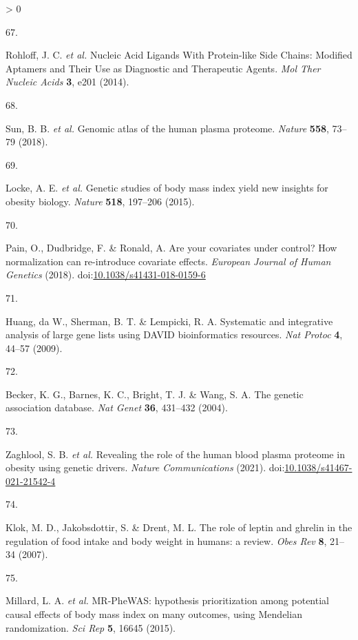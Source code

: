 \documentclass[11pt,twoside]{bristolthesis}
\newlength{\cslhangindent}
\newlength{\csllabelwidth}
\newenvironment{CSLReferences}[2] %
 {%
  \setlength{\parindent}{0pt}
  \ifodd #1 \everypar{\setlength{\hangindent}{\cslhangindent}}\ignorespaces\fi
  \ifnum #2 > 0
  \setlength{\parskip}{#2\baselineskip}
  \fi
 }%
 {}
\newcommand{\CSLLeftMargin}[1]{\parbox[t]{\csllabelwidth}{#1}}
\newcommand{\CSLRightInline}[1]{\parbox[t]{\linewidth - \csllabelwidth}{#1}\break}
\begin{document}
\begin{CSLReferences}{0}{0}
\leavevmode\hypertarget{ref-Rohloff2014}{}%
\CSLLeftMargin{67. }
\CSLRightInline{Rohloff, J. C. \emph{et al.} {Nucleic Acid Ligands With Protein-like Side Chains: Modified Aptamers and Their Use as Diagnostic and Therapeutic Agents}. \emph{Mol Ther Nucleic Acids} \textbf{3}, e201 (2014).}

\leavevmode\hypertarget{ref-Sun2018}{}%
\CSLLeftMargin{68. }
\CSLRightInline{Sun, B. B. \emph{et al.} {Genomic atlas of the human plasma proteome}. \emph{Nature} \textbf{558}, 73--79 (2018).}

\leavevmode\hypertarget{ref-Locke2015}{}%
\CSLLeftMargin{69. }
\CSLRightInline{Locke, A. E. \emph{et al.} {Genetic studies of body mass index yield new insights for obesity biology}. \emph{Nature} \textbf{518}, 197--206 (2015).}

\leavevmode\hypertarget{ref-Pain2018}{}%
\CSLLeftMargin{70. }
\CSLRightInline{Pain, O., Dudbridge, F. \& Ronald, A. {Are your covariates under control? How normalization can re-introduce covariate effects}. \emph{European Journal of Human Genetics} (2018). doi:\href{https://doi.org/10.1038/s41431-018-0159-6}{10.1038/s41431-018-0159-6}}

\leavevmode\hypertarget{ref-Huang2009}{}%
\CSLLeftMargin{71. }
\CSLRightInline{Huang, da W., Sherman, B. T. \& Lempicki, R. A. {Systematic and integrative analysis of large gene lists using DAVID bioinformatics resources}. \emph{Nat Protoc} \textbf{4}, 44--57 (2009).}

\leavevmode\hypertarget{ref-Becker2004a}{}%
\CSLLeftMargin{72. }
\CSLRightInline{Becker, K. G., Barnes, K. C., Bright, T. J. \& Wang, S. A. {The genetic association database}. \emph{Nat Genet} \textbf{36}, 431--432 (2004).}

\leavevmode\hypertarget{ref-Zaghlool2021}{}%
\CSLLeftMargin{73. }
\CSLRightInline{Zaghlool, S. B. \emph{et al.} {Revealing the role of the human blood plasma proteome in obesity using genetic drivers}. \emph{Nature Communications} (2021). doi:\href{https://doi.org/10.1038/s41467-021-21542-4}{10.1038/s41467-021-21542-4}}

\leavevmode\hypertarget{ref-Klok2007}{}%
\CSLLeftMargin{74. }
\CSLRightInline{Klok, M. D., Jakobsdottir, S. \& Drent, M. L. {The role of leptin and ghrelin in the regulation of food intake and body weight in humans: a review}. \emph{Obes Rev} \textbf{8}, 21--34 (2007).}

\leavevmode\hypertarget{ref-Millard2015}{}%
\CSLLeftMargin{75. }
\CSLRightInline{Millard, L. A. \emph{et al.} {MR-PheWAS: hypothesis prioritization among potential causal effects of body mass index on many outcomes, using Mendelian randomization}. \emph{Sci Rep} \textbf{5}, 16645 (2015).}


\end{CSLReferences}
\end{document}

